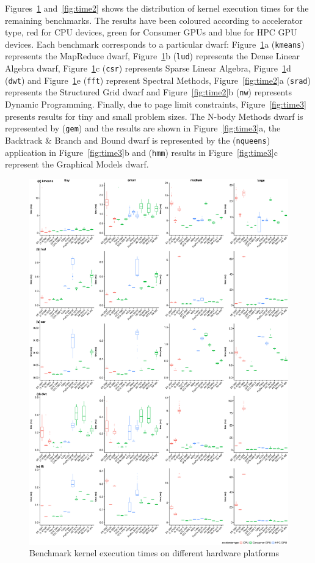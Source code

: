 \documentclass[../document.tex]{subfiles}
\begin{document}
Figures~\ref{fig:time} and~\ref{fig:time2} shows the distribution of kernel execution times for the remaining benchmarks.
The results have been coloured according to accelerator type, red for CPU devices, green for Consumer GPUs and  blue for HPC GPU devices.
Each benchmark corresponds to a particular dwarf: 
Figure~\ref{fig:time}a ({\tt kmeans}) represents the MapReduce dwarf,
Figure~\ref{fig:time}b ({\tt lud}) represents the Dense Linear Algebra dwarf,
Figure~\ref{fig:time}c ({\tt csr}) represents Sparse Linear Algebra, 
Figure~\ref{fig:time}d ({\tt dwt}) and Figure~\ref{fig:time}e ({\tt fft}) represent Spectral Methods,
Figure~\ref{fig:time2}a ({\tt srad}) represents the Structured Grid dwarf and Figure~\ref{fig:time2}b ({\tt nw}) represents Dynamic Programming.
Finally, due to page limit constraints, Figure~\ref{fig:time3} presents results for tiny and small problem sizes.
The N-body Methods dwarf is represented by ({\tt gem}) and the results are shown in Figure~\ref{fig:time3}a, the Backtrack \& Branch and Bound dwarf is represented by the ({\tt nqueens}) application in Figure~\ref{fig:time3}b and ({\tt hmm}) results in Figure~\ref{fig:time3}c represent the Graphical Models dwarf.


\begin{figure}
    \centering
    \includegraphics[width=.9\textwidth,keepaspectratio]{figures/new-time-results/generate_main_4x5_bandwplot}
    \caption{Benchmark kernel execution times on different hardware platforms}
    \label{fig:time}
\end{figure}
\end{document}
